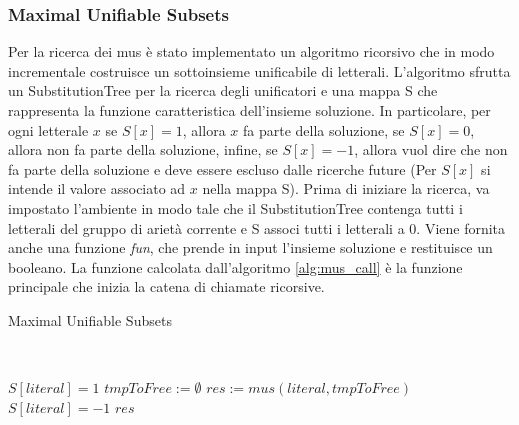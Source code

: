 \documentclass[./main.tex]{subfiles}
\begin{document}
\subsubsection{Maximal Unifiable Subsets}

Per la ricerca dei mus è stato implementato un algoritmo ricorsivo che in modo incrementale costruisce un sottoinsieme unificabile di letterali.
L'algoritmo sfrutta un SubstitutionTree per la ricerca degli unificatori e una mappa S che rappresenta la funzione caratteristica 
dell'insieme soluzione. 
In particolare, per ogni letterale $x$ se $S[x] = 1$, allora $x$ fa parte della soluzione, se $S[x] = 0$, allora non fa parte della soluzione,
infine, se $S[x] = -1$, allora vuol dire che non fa parte della soluzione e deve essere escluso dalle ricerche future
(Per $S[x]$ si intende il valore associato ad $x$ nella mappa S).
Prima di iniziare la ricerca, va impostato l'ambiente in modo tale che il SubstitutionTree contenga tutti i letterali 
del gruppo di arietà corrente e S associ tutti i letterali a 0. 
Viene fornita anche una funzione \textit{fun}, che prende in input l'insieme soluzione e restituisce un booleano.
La funzione calcolata dall'algoritmo \ref{alg:mus_call} è la funzione principale che inizia la catena di chiamate ricorsive. 






\begin{algorithm}[H] \label{alg:mus_call}
    \caption{Maximal Unifiable Subsets}
    \\

\nl {}
\nl {}

$S[literal] = 1$\;
$tmpToFree := \emptyset$\;
$res := mus(literal, tmpToFree)$\;
$S[literal] = -1$\;
\Return $res$\;
\end{algorithm}
\end{document}
